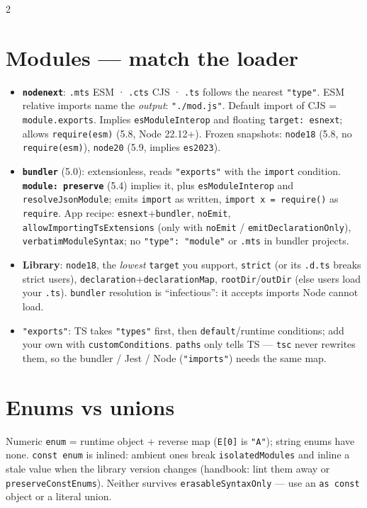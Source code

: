 \documentclass[8pt]{extarticle}
\newcommand\ct[1]{\texttt{#1}}
\begin{document}
\begin{multicols}{2}
\section{Modules — match the loader}
\begin{itemize}
  \item \ct{\textbf{nodenext}}: \ct{.mts} ESM · \ct{.cts} CJS · \ct{.ts} follows the nearest
        \ct{"type"}. ESM relative imports name the \emph{output}: \ct{"./mod.js"}. Default import
        of CJS = \ct{module.exports}. Implies \ct{esModuleInterop} and floating
        \ct{target: esnext}; allows \ct{require(esm)} (5.8, Node 22.12+). Frozen snapshots:
        \ct{node18} (5.8, no \ct{require(esm)}), \ct{node20} (5.9, implies \ct{es2023}).
  \item \ct{\textbf{bundler}} (5.0): extensionless, reads \ct{"exports"} with the \ct{import}
        condition. \ct{\textbf{module: preserve}} (5.4) implies it, plus \ct{esModuleInterop} and
        \ct{resolveJsonModule}; emits \ct{import} as written, \ct{import x = require()} as
        \ct{require}. App recipe: \ct{esnext}+\ct{bundler}, \ct{noEmit},
        \ct{allowImportingTsExtensions} (only with \ct{noEmit} / \ct{emitDeclarationOnly}),
        \ct{verbatimModuleSyntax}; no \ct{"type": "module"} or \ct{.mts} in bundler projects.
  \item \textbf{Library}: \ct{node18}, the \emph{lowest} \ct{target} you support, \ct{strict} (or
        its \ct{.d.ts} breaks strict users), \ct{declaration}+\ct{declarationMap},
        \ct{rootDir}/\ct{outDir} (else users load your \ct{.ts}). \ct{bundler} resolution is
        ``infectious'': it accepts imports Node cannot load.
  \item \ct{"exports"}: TS takes \ct{"types"} first, then \ct{default}/runtime conditions;
        add your own with \ct{customConditions}. \ct{paths} only tells TS — \ct{tsc} never
        rewrites them, so the bundler / Jest / Node (\ct{"imports"}) needs the same map.
\end{itemize}

\section{Enums vs unions}
Numeric \ct{enum} = runtime object + reverse map (\ct{E[0]} is \ct{"A"}); string enums have none.
\ct{const enum} is inlined: ambient ones break \ct{isolatedModules} and inline a stale value when
the library version changes (handbook: lint them away or \ct{preserveConstEnums}). Neither survives
\ct{erasableSyntaxOnly} — use an \ct{as const} object or a literal union.


\end{multicols}
\end{document}
